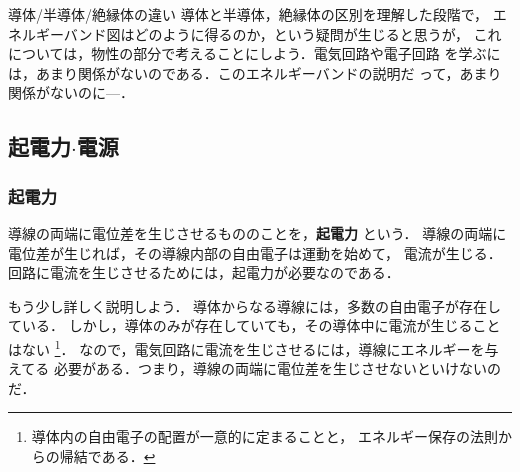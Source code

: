 \begin{memo}{導体/半導体/絶縁体の違い}
           導体と半導体，絶縁体の区別を理解した段階で，
           エネルギーバンド図はどのように得るのか，という疑問が生じると思うが，
           これについては，物性の部分で考えることにしよう．電気回路や電子回路
           を学ぶには，あまり関係がないのである．このエネルギーバンドの説明だ
           って，あまり関係がないのに---．
        \end{memo}


    \subsection{起電力$\cdot$電源}
    \subsubsection{起電力}
        導線の両端に電位差を生じさせるもののことを，\textbf{起電力} という．
        導線の両端に電位差が生じれば，その導線内部の自由電子は運動を始めて，
        電流が生じる．回路に電流を生じさせるためには，起電力が必要なのである．

        もう少し詳しく説明しよう．
        導体からなる導線には，多数の自由電子が存在している．
        しかし，導体のみが存在していても，その導体中に電流が生じることはない
            \footnote{
                導体内の自由電子の配置が一意的に定まることと，
                エネルギー保存の法則からの帰結である．
            }．
        なので，電気回路に電流を生じさせるには，導線にエネルギーを与えてる
        必要がある．つまり，導線の両端に電位差を生じさせないといけないのだ．

